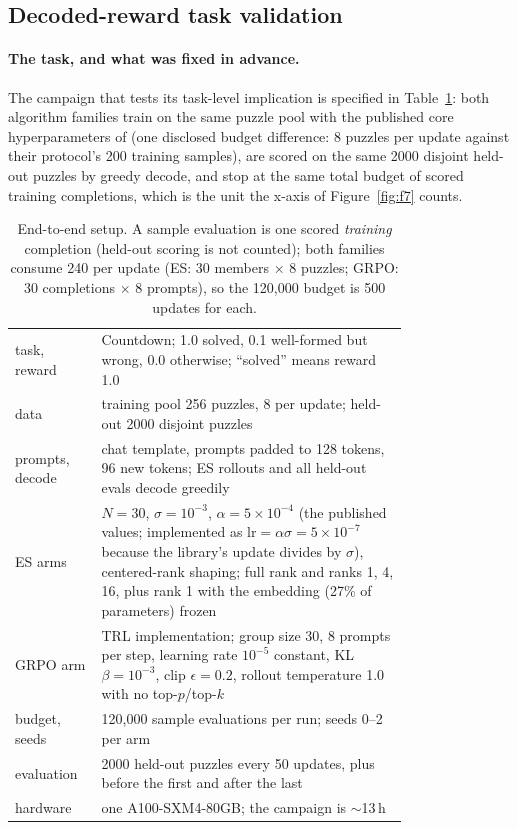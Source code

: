 


\subsection{Decoded-reward task validation}
\paragraph{The task, and what was fixed in advance.} The campaign that
tests its task-level implication is specified in Table~\ref{tab:e2e}: both algorithm
families train on the same puzzle pool with the published core
hyperparameters of \citet{qiu2025} (one disclosed budget difference:
8 puzzles per update against their protocol's 200 training samples), are
scored on the same 2000 disjoint held-out puzzles by greedy decode, and
stop at the same total budget of scored training completions, which is
the unit the x-axis of Figure~\ref{fig:f7} counts.

\begin{table}[t]
\centering
\small
\caption{End-to-end setup. A sample evaluation is one scored
  \emph{training} completion (held-out scoring is not counted); both
  families consume 240 per update (ES: 30 members $\times$ 8 puzzles;
  GRPO: 30 completions $\times$ 8 prompts), so the 120{,}000 budget is
  500 updates for each.}
\label{tab:e2e}
\begin{tabular}{lp{0.78\linewidth}}
\toprule
task, reward & Countdown; 1.0 solved, 0.1 well-formed but wrong, 0.0
  otherwise; ``solved'' means reward 1.0 \\
data & training pool 256 puzzles, 8 per update; held-out 2000 disjoint
  puzzles \\
prompts, decode & chat template, prompts padded to 128 tokens, 96 new
  tokens; ES rollouts and all held-out evals decode greedily \\
ES arms & $N{=}30$, $\sigma{=}10^{-3}$, $\alpha{=}5\times10^{-4}$ (the
  published values; implemented as $\mathrm{lr}{=}\alpha\sigma{=}5\times10^{-7}$
  because the library's update divides by $\sigma$), centered-rank
  shaping; full rank and ranks 1, 4, 16, plus rank 1 with the embedding
  (27\% of parameters) frozen \\
GRPO arm & TRL implementation; group size 30, 8 prompts per step,
  learning rate $10^{-5}$ constant, KL $\beta{=}10^{-3}$, clip
  $\epsilon{=}0.2$, rollout temperature 1.0 with no top-$p$/top-$k$ \\
budget, seeds & 120{,}000 sample evaluations per run; seeds 0--2 per arm \\
evaluation & 2000 held-out puzzles every 50 updates, plus before the
  first and after the last \\
hardware & one A100-SXM4-80GB; the campaign is $\sim$13\,h \\
\bottomrule
\end{tabular}
\end{table}


